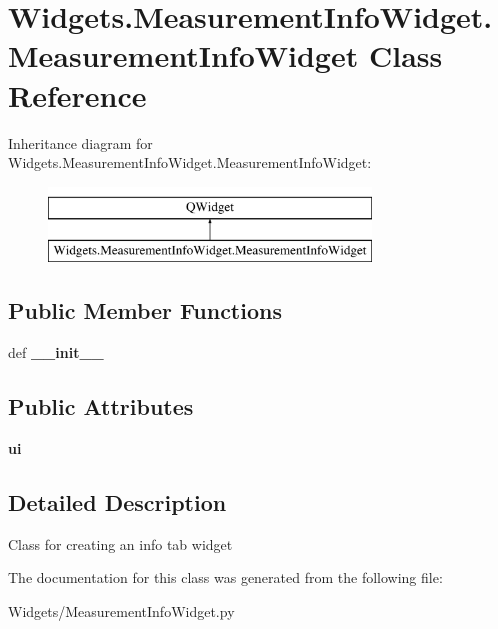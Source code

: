 \hypertarget{classWidgets_1_1MeasurementInfoWidget_1_1MeasurementInfoWidget}{\section{Widgets.\-Measurement\-Info\-Widget.\-Measurement\-Info\-Widget Class Reference}
\label{classWidgets_1_1MeasurementInfoWidget_1_1MeasurementInfoWidget}
}
Inheritance diagram for Widgets.\-Measurement\-Info\-Widget.\-Measurement\-Info\-Widget\-:\begin{figure}[H]
\begin{center}
\leavevmode
\includegraphics[height=2.000000cm]{classWidgets_1_1MeasurementInfoWidget_1_1MeasurementInfoWidget}
\end{center}
\end{figure}
\subsection*{Public Member Functions}
\begin{DoxyCompactItemize}
\item 
\hypertarget{classWidgets_1_1MeasurementInfoWidget_1_1MeasurementInfoWidget_a5cc553f810b6582d39c6a105c5f050c9}{def {\bfseries \-\_\-\-\_\-init\-\_\-\-\_\-}}\label{classWidgets_1_1MeasurementInfoWidget_1_1MeasurementInfoWidget_a5cc553f810b6582d39c6a105c5f050c9}

\end{DoxyCompactItemize}
\subsection*{Public Attributes}
\begin{DoxyCompactItemize}
\item 
\hypertarget{classWidgets_1_1MeasurementInfoWidget_1_1MeasurementInfoWidget_a6793251b040a8e67de81a3994366abee}{{\bfseries ui}}\label{classWidgets_1_1MeasurementInfoWidget_1_1MeasurementInfoWidget_a6793251b040a8e67de81a3994366abee}

\end{DoxyCompactItemize}


\subsection{Detailed Description}
\begin{DoxyVerb}Class for creating an info tab widget
\end{DoxyVerb}
 

The documentation for this class was generated from the following file\-:\begin{DoxyCompactItemize}
\item 
Widgets/Measurement\-Info\-Widget.\-py\end{DoxyCompactItemize}
